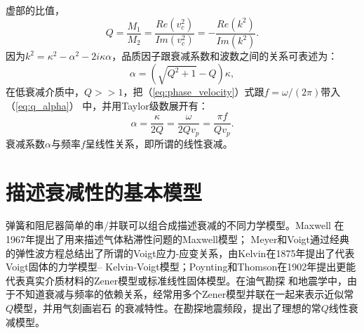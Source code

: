 虚部的比值，
\begin{equation}
	Q=\frac{M_1}{M_2}=\frac{Re(v_c^2)}{Im(v_c^2)}=-\frac{Re(k^2)}{Im(k^2)}.
	\label{eq:qm}
\end{equation}
因为$k^2=\kappa^2-\alpha^2-2i\kappa\alpha$，品质因子跟衰减系数和波数之间的关系可表述为：
\begin{equation}
	\alpha=(\sqrt{Q^2+1}-Q)\kappa,
	\label{eq:q_alpha}
\end{equation}
在低衰减介质中，$Q>>1$，把（\ref{eq:phase_velocity}）式跟$f=\omega/(2\pi)$带入（\ref{eq:q_alpha}）
中，并用Taylor级数展开有：
\begin{equation}
	\alpha=\frac{\kappa}{2Q}=\frac{\omega}{2Qv_p}=\frac{\pi f}{Qv_p}.
	\label{eq:linear_visco}
\end{equation}
衰减系数$\alpha$与频率$f$呈线性关系，即所谓的线性衰减。

\section{描述衰减性的基本模型}
\vspace{0.2cm}
弹簧和阻尼器简单的串/并联可以组合成描述衰减的不同力学模型。Maxwell 在1967年提出了用来描述气体粘滞性问题的Maxwell模型；
Meyer和Voigt通过经典的弹性波方程总结出了所谓的Voigt应力-应变关系，由Kelvin在1875年提出了代表Voigt固体的力学模型--
Kelvin-Voigt模型；Poynting和Thomson在1902年提出更能代表真实介质材料的Zener模型或标准线性固体模型。在油气勘探
和地震学中，由于不知道衰减与频率的依赖关系，经常用多个Zener模型并联在一起来表示近似常$Q$模型，并用气刻画岩石
的衰减特性。在勘探地震频段，提出了理想的常$Q$线性衰减模型。

